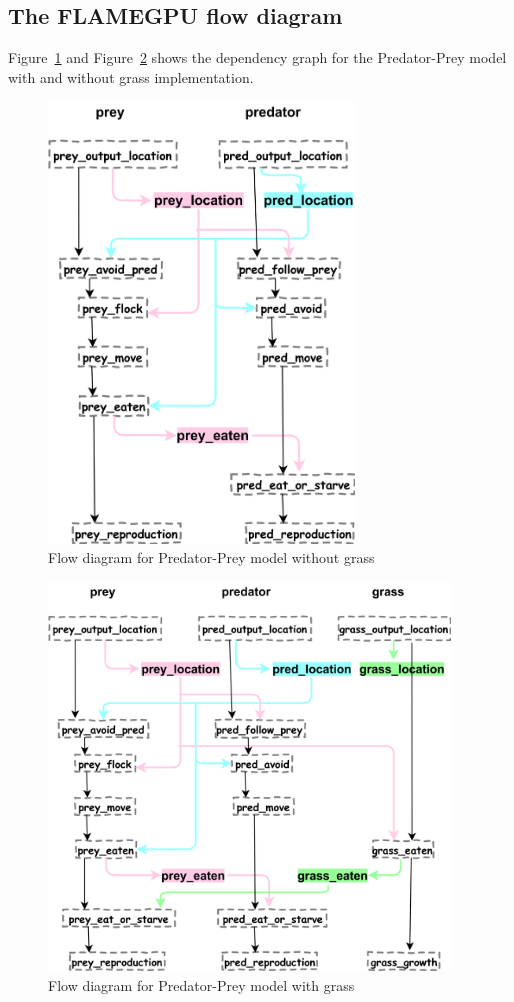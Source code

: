 \subsection{The FLAMEGPU flow diagram}
Figure~\ref{fig:flowdiagram1} and Figure~\ref{fig:flowdiagram2} shows the dependency graph for the Predator-Prey model with and without grass implementation.

\begin{figure}[h]
    \centering
    \includegraphics[width=3.2in]{prey_pred}
    \caption{Flow diagram for Predator-Prey model without grass}
    \label{fig:flowdiagram1}
\end{figure}

\begin{figure}[h]
    \centering
    \includegraphics[width=4.2in]{prey_pred_grass}
    \caption{Flow diagram for Predator-Prey model with grass}
    \label{fig:flowdiagram2}
\end{figure}

